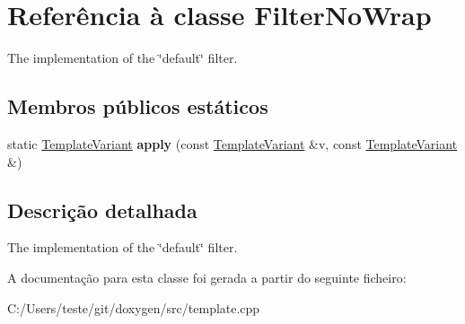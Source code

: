 \hypertarget{class_filter_no_wrap}{\section{Referência à classe Filter\-No\-Wrap}
\label{class_filter_no_wrap}
}


The implementation of the \char`\"{}default\char`\"{} filter.  


\subsection*{Membros públicos estáticos}
\begin{DoxyCompactItemize}
\item 
\hypertarget{class_filter_no_wrap_ab7b829ea4352fa331a604fe7ea3e89c8}{static \hyperlink{class_template_variant}{Template\-Variant} {\bfseries apply} (const \hyperlink{class_template_variant}{Template\-Variant} \&v, const \hyperlink{class_template_variant}{Template\-Variant} \&)}\label{class_filter_no_wrap_ab7b829ea4352fa331a604fe7ea3e89c8}

\end{DoxyCompactItemize}


\subsection{Descrição detalhada}
The implementation of the \char`\"{}default\char`\"{} filter. 

A documentação para esta classe foi gerada a partir do seguinte ficheiro\-:\begin{DoxyCompactItemize}
\item 
C\-:/\-Users/teste/git/doxygen/src/template.\-cpp\end{DoxyCompactItemize}
